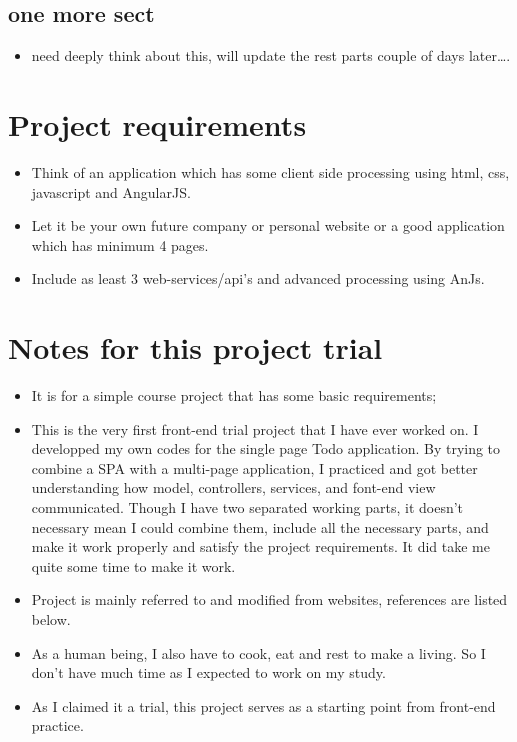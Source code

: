 \documentclass[9pt,b5paper]{article}
\begin{document}
\subsection{one more sect}
\label{sec-12-5}
\begin{itemize}
\item need deeply think about this, will update the rest parts couple of days later\ldots{}.
\end{itemize}


\section{Project requirements}
\label{sec-13}
\begin{itemize}
\item Think of an application which has some client side processing using html, css, javascript and AngularJS.
\item Let it be your own future company or personal website or a good application which has minimum 4 pages.
\item Include as least 3 web-services/api's and advanced processing using AnJs.
\end{itemize}

\section{Notes for this project trial}
\label{sec-14}
\begin{itemize}
\item It is for a simple course project that has some basic requirements;
\item This is the very first front-end trial project that I have ever worked on. I developped my own codes for the single page Todo application. By trying to combine a SPA with a multi-page application, I practiced and got better understanding how model, controllers, services, and font-end view communicated. Though I have two separated working parts, it doesn't necessary mean I could combine them, include all the necessary parts, and make it work properly and satisfy the project requirements. It did take me quite some time to make it work.
\item Project is mainly referred to and modified from websites, references are listed below.
\item As a human being, I also have to cook, eat and rest to make a living. So I don't have much time as I expected to work on my study.
\item As I claimed it a trial, this project serves as a starting point from front-end practice.
\end{itemize}
\end{document}
